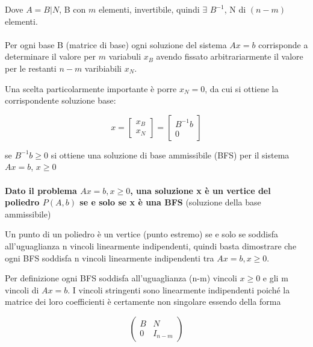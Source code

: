 \documentclass[a4paper, 11pt]{article}
\begin{document}
        Dove $A = B|N$, B con $m$ elementi, invertibile, quindi $\exists$ $B^{-1}$, N di $(n-m)$ elementi.
        

        \paragraph{}
        Per ogni base B (matrice di base) ogni soluzione del sistema $Ax = b$ corrisponde a determinare il valore per $m$ variabuli $x_B$ avendo fissato arbitrariarmente il valore per le restanti $n-m$ varibiabili $x_N$.

        Una scelta particolarmente importante è porre $x_N = 0$, da cui si ottiene la corrispondente soluzione base: 
        
        \[ 
            x = 
            \begin{bmatrix}
                x_B \\
                x_N
            \end{bmatrix}
            = 
            \begin{bmatrix}
                B^{-1}b \\
                0
            \end{bmatrix}
        \]



        se $B^{-1} b \geq 0$ si ottiene una soluzione di base ammissibile (BFS) per il sistema $Ax = b$, $x \geq 0$


        \paragraph{}
        \textbf{Dato il problema $Ax = b,x \geq 0$, una soluzione x è un vertice del
        poliedro $P(A, b)$ se e solo se x è una BFS} (soluzione della base ammissibile)

        Un punto di un poliedro è un vertice (punto estremo) se e solo se soddisfa all’uguaglianza n vincoli linearmente indipendenti, quindi basta dimostrare che ogni BFS soddisfa n vincoli linearmente indipendenti tra $Ax = b,x \geq 0$.

        Per definizione ogni BFS soddisfa all’uguaglianza (n-m) vincoli $x \geq 0$ e gli m
        vincoli di $Ax = b$. I vincoli stringenti sono linearmente indipendenti poiché la matrice dei loro coefficienti è certamente non singolare essendo della forma
        

        \[
            \begin{pmatrix}
                B & N \\
                0 & I_{n-m}
            \end{pmatrix}
        \]
\end{document}
